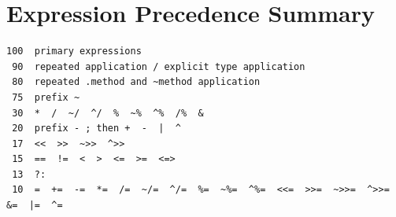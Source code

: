 \documentclass[12pt,oneside]{article}
\begin{document}
\section{Expression Precedence Summary}
\begin{verbatim}
100  primary expressions
 90  repeated application / explicit type application
 80  repeated .method and ~method application
 75  prefix ~
 30  *  /  ~/  ^/  %  ~%  ^%  /%  &
 20  prefix - ; then +  -  |  ^
 17  <<  >>  ~>>  ^>>
 15  ==  !=  <  >  <=  >=  <=>
 13  ?:
 10  =  +=  -=  *=  /=  ~/=  ^/=  %=  ~%=  ^%=  <<=  >>=  ~>>=  ^>>=  &=  |=  ^=
\end{verbatim}
\end{document}

